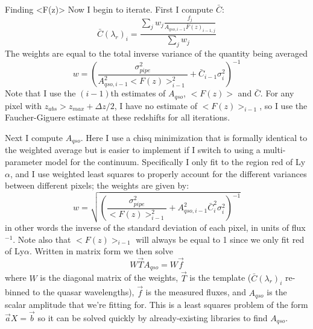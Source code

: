 \documentclass[12pt]{aastex}
\begin{document}
\begin{section}{Finding <F(z)>}
Now I begin to iterate.  First I compute $\bar{C}$:
\begin{equation}
\bar{C}(\lambda_r)_{i} = \frac{\sum_j w_j \frac{f_j}{A_{qso,i-1} \bar{F}(z)_{i-1,j}}}{\sum_j w_j}
\label{eqn:c_i}
\end{equation}
 The weights are equal to the total inverse variance of the quantity being averaged
\begin{equation}
w = \left(\frac{\sigma_{pipe}^2}{A_{qso,i-1}^2 <F(z)>_{i-1}^2} + \bar{C}_{i-1} \sigma_i^2\right)^{-1}
\label{eqn:wt_for_c_i}
\end{equation}
Note that I use the $(i-1)$th estimates of $A_{qso}$, $<F(z)>$ and $\bar{C}$. 
For any pixel with $z_{abs} > z_{max} + \Delta z/2$, I have no estimate of $<F(z)>_{i-1}$, so I use
the Faucher-Giguere estimate at these redshifts for all iterations.

Next I compute $A_{qso}$.  Here I use a chisq minimization that is formally identical to the weighted average but is easier to implement
if I switch to using a multi-parameter model for the continuum.
Specifically I only fit to the region red of Ly$\alpha$,
and I use weighted least squares to properly account for the different variances between different pixels; the weights are given by:
\begin{equation}
w = \sqrt{\left(\frac{\sigma_{pipe}^2}{<F(z)>_{i-1}^2} + A_{qso,i-1}^2 \bar{C}_{i}^2 \sigma_i^2\right)^{-1}}
\label{eqn:wt_for_least_squares}
\end{equation}
in other words the inverse of the standard deviation of each pixel, in units of flux$^{-1}$.
Note also that $<F(z)>_{i-1}$ will always be equal to 1 since we only fit red of Ly$\alpha$.
Written in matrix form we then solve
\begin{equation}
W \vec{T} A_{qso} = W \vec{f}
\label{eqn:lls}
\end{equation}
where $W$ is the diagonal matrix of the weights, $\vec{T}$ is the template ($\bar{C}(\lambda_r)_i$ re-binned to the quasar wavelengths), $\vec{f}$ is the measured fluxes, 
and $A_{qso}$ is the scalar amplitude that we're fitting for.  This is a least squares problem of the form $\vec{a} X = \vec{b}$ so it can be
solved quickly by already-existing libraries to find $A_{qso}$.


\end{section}
\end{document}
